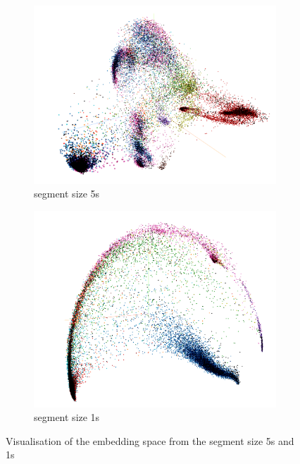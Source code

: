 \begin{figure}[htb]
\centering
\begin{subfigure}{.5\linewidth}
  \centering
  \includegraphics[width=.9\linewidth]{study-doc/experiment_tile_size/assets/embedding_space_5s.png}
  \caption{segment size 5s}
  \label{fig:embedding-5s}
\end{subfigure}%
\begin{subfigure}{.5\linewidth}
  \centering
  \includegraphics[width=.9\linewidth]{study-doc/experiment_tile_size/assets/embedding_space_1s.png}
  \caption{segment size 1s}
  \label{fig:embedding-1s}
\end{subfigure}
\caption{Visualisation of the embedding space from the segment size 5s and 1s}
\label{fig:tile-size-experiment-embedding-space}
\end{figure}

